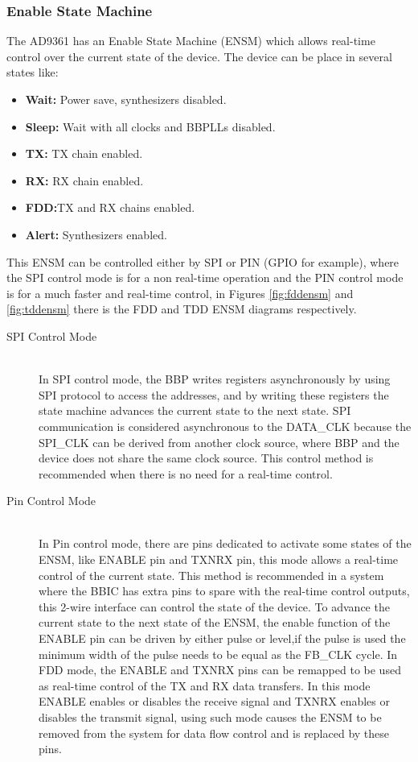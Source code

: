 \subsubsection{Enable State Machine}

The AD9361 has an Enable State Machine (ENSM) which allows real-time control
over the current state of the device. The device can be place in several states
like:

\begin{itemize}
		\item \textbf{Wait:} Power save, synthesizers disabled.
		\item \textbf{Sleep:} Wait with all clocks and BBPLLs disabled.
		\item \textbf{TX:} TX chain enabled.
		\item \textbf{RX:} RX chain enabled.
		\item \textbf{FDD:}TX and RX chains enabled.
		\item \textbf{Alert:} Synthesizers enabled.
	\end{itemize}

This ENSM can be controlled either by SPI or PIN (GPIO for example), where the
SPI control mode is for a non real-time operation and the PIN control mode is
for a much faster and real-time control, in Figures \ref{fig:fddensm} and
\ref{fig:tddensm} there is the FDD and TDD ENSM diagrams respectively.


\begin{description}
	\item[SPI Control Mode] \hfill \\
	In SPI control mode, the BBP writes registers asynchronously by using SPI
	protocol to access the addresses, and by writing these registers the state
	machine advances the current state to the next state. SPI communication is
	considered asynchronous to the DATA\_CLK because the SPI\_CLK can be derived
	from another clock source, where BBP and the device does not share the same
	clock source. This control method is recommended when there is no need for a
	real-time control.

	\item[Pin Control Mode] \hfill \\
	In Pin control mode, there are pins dedicated to activate some states of the
	ENSM, like ENABLE pin and TXNRX pin, this mode allows a real-time control of
	the current state. This method is recommended in a system where the BBIC has
	extra pins to spare with the real-time control outputs, this 2-wire interface
	can control the state of the device. To advance the current state to the next
	state of the ENSM, the enable function of the ENABLE pin can be driven by
	either pulse or level,if the pulse is used the minimum width of the pulse needs
	to be equal as the FB\_CLK cycle. In FDD mode, the ENABLE and TXNRX pins can be
	remapped to be used as real-time control of the TX and RX data transfers. In
	this mode ENABLE enables or disables the receive signal and TXNRX enables or
	disables the transmit signal, using such mode  causes the ENSM to be removed
	from the system for data flow control and is replaced by these pins.

\end{description}

